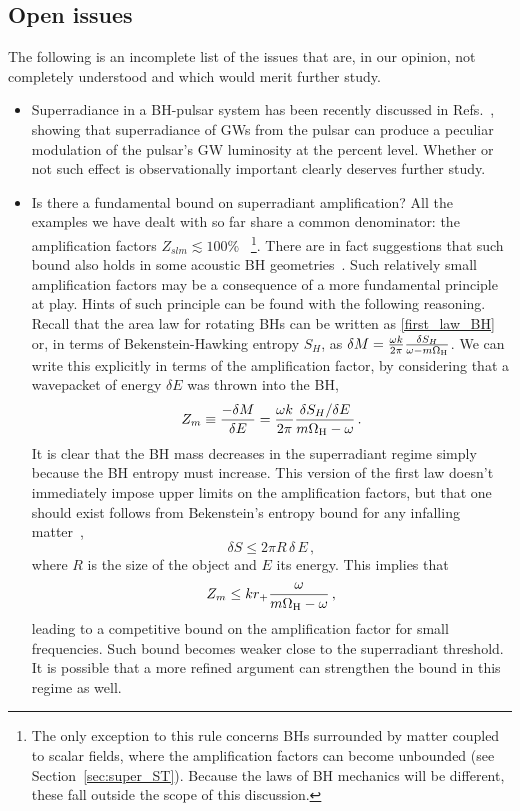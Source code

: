 \documentclass[11pt]{article}
\newcommand{\be}{\begin{equation}}
\newcommand{\ee}{\end{equation}}
\numberwithin{equation}{section} %
\begin{document}
\subsection{Open issues\label{open4}}

The following is an incomplete list of the issues that are, in our opinion, not completely understood and which would merit further study.

\begin{itemize}

\item Superradiance in a BH-pulsar system has been recently discussed in Refs.~\cite{Rosa:2015hoa,Rosa:2016bli}, 
showing that superradiance of GWs from the pulsar can produce a peculiar modulation of the pulsar's GW luminosity at 
the percent level. Whether or not such effect is observationally important clearly deserves further study.

\item Is there a fundamental bound on superradiant amplification?
All the examples we have dealt with so far share a common denominator: the amplification factors $Z_{slm}\lesssim 100\%$~
\footnote{The only exception to this rule concerns BHs surrounded by matter coupled to scalar fields, where the amplification factors
can become unbounded (see Section~\ref{sec:super_ST}). Because the laws of BH mechanics will be different, these fall outside
the scope of this discussion.}. There are in fact suggestions that such bound also holds in some acoustic BH geometries~\cite{Choy:2005qx}.
Such relatively small amplification factors may be a consequence of a more fundamental principle at play.
Hints of such principle can be found with the following reasoning.
Recall that the area law for rotating BHs can be written as \eqref{first_law_BH} or, in terms of Bekenstein-Hawking entropy $S_H$, as
$\delta M=\frac{\omega k}{2\pi}\frac{\delta S_H}{\omega-m\Omega_{\rm H}}$. We can write this explicitly in terms of the amplification factor,
by considering that a wavepacket of energy $\delta E$ was thrown into the BH,
%
\be
Z_{m}\equiv \frac{-\delta M}{\delta E}=\frac{\omega k}{2\pi}\frac{\delta S_H/\delta E}{m\Omega_{\rm H}-\omega}\,.
\ee
%
It is clear that the BH mass decreases in the superradiant regime simply because the BH entropy must increase. 
This version of the first law doesn't immediately impose upper limits on the amplification factors, but that one should exist
follows from Bekenstein's entropy bound for any infalling matter~\cite{Bekenstein:1980jp},
%
\be
\delta S\leq 2\pi R\,\delta\,E\,,\label{Bek_bound}
\ee
%
where $R$ is the size of the object and $E$ its energy. This implies that
%
\begin{equation}
Z_{m}\leq k r_+ \frac{\omega}{m\Omega_{\rm H}-\omega}\,,\label{aiai}
\end{equation}
%
leading to a competitive bound on the amplification factor for small frequencies. Such bound becomes weaker close to the superradiant threshold. It is possible that a more refined argument can strengthen the bound in this regime as well.



\end{itemize}
\end{document}
